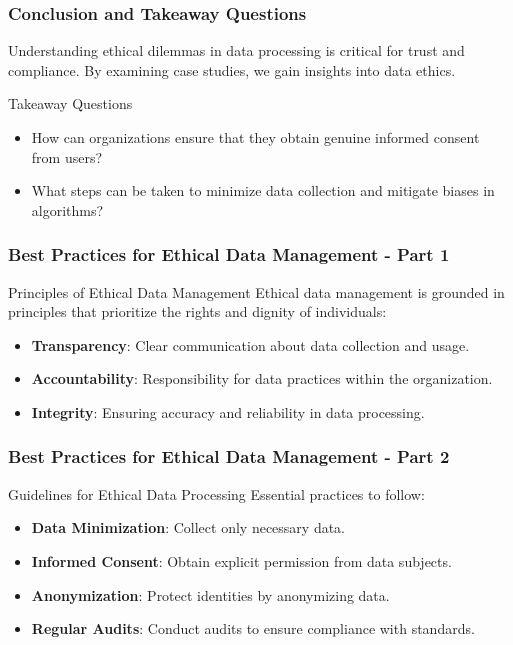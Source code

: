 \documentclass{beamer}
\begin{document}
\begin{frame}[fragile]
    \frametitle{Conclusion and Takeaway Questions}
    Understanding ethical dilemmas in data processing is critical for trust and compliance. By examining case studies, we gain insights into data ethics.

    \begin{block}{Takeaway Questions}
        \begin{itemize}
            \item How can organizations ensure that they obtain genuine informed consent from users?
            \item What steps can be taken to minimize data collection and mitigate biases in algorithms?
        \end{itemize}
    \end{block}
\end{frame}

\begin{frame}[fragile]
    \frametitle{Best Practices for Ethical Data Management - Part 1}
    \begin{block}{Principles of Ethical Data Management}
        Ethical data management is grounded in principles that prioritize the rights and dignity of individuals:
    \end{block}
    \begin{itemize}
        \item \textbf{Transparency}: Clear communication about data collection and usage.
        \item \textbf{Accountability}: Responsibility for data practices within the organization.
        \item \textbf{Integrity}: Ensuring accuracy and reliability in data processing.
    \end{itemize}
\end{frame}

\begin{frame}[fragile]
    \frametitle{Best Practices for Ethical Data Management - Part 2}
    \begin{block}{Guidelines for Ethical Data Processing}
        Essential practices to follow:
    \end{block}
    \begin{itemize}
        \item \textbf{Data Minimization}: Collect only necessary data.
        \item \textbf{Informed Consent}: Obtain explicit permission from data subjects.
        \item \textbf{Anonymization}: Protect identities by anonymizing data.
        \item \textbf{Regular Audits}: Conduct audits to ensure compliance with standards.
    \end{itemize}
\end{frame}
\end{document}
